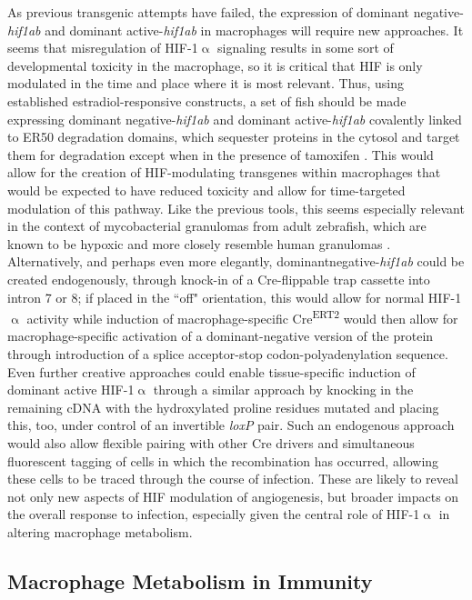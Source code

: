 As previous transgenic attempts have failed, the expression of dominant negative\hyp{}\textit{hif1ab} and dominant active\hyp{}\textit{hif1ab} in macrophages will require new approaches. It seems that misregulation of HIF\hyp{}1$\upalpha$ signaling results in some sort of developmental toxicity in the macrophage, so it is critical that HIF is only modulated in the time and place where it is most relevant. Thus, using established estradiol\hyp{}responsive constructs, a set of fish should be made expressing dominant negative\hyp{}\textit{hif1ab} and dominant active\hyp{}\textit{hif1ab} covalently linked to ER50 degradation domains, which sequester proteins in the cytosol and target them for degradation except when in the presence of tamoxifen \citep{Miyazaki2012}. This would allow for the creation of HIF\hyp{}modulating transgenes within macrophages that would be expected to have reduced toxicity and allow for time\hyp{}targeted modulation of this pathway. Like the previous tools, this seems especially relevant in the context of mycobacterial granulomas from adult zebrafish, which are known to be hypoxic and more closely resemble human granulomas \citep{Harper2012, Oehlers2015, Rustad2009}. Alternatively, and perhaps even more elegantly, dominantnegative\hyp{}\textit{hif1ab} could be created endogenously, through knock\hyp{}in of a Cre\hyp{}flippable trap cassette into intron 7 or 8; if placed in the ``off" orientation, this would allow for normal HIF\hyp{}1$\upalpha$ activity while induction of macrophage-specific Cre\textsuperscript{ERT2} would then allow for macrophage\hyp{}specific activation of a dominant\hyp{}negative version of the protein through introduction of a splice acceptor\hyp{}stop codon\hyp{}polyadenylation sequence. Even further creative approaches could enable tissue\hyp{}specific induction of dominant active HIF\hyp{}1$\upalpha$ through a similar approach by knocking in the remaining cDNA with the hydroxylated proline residues mutated and placing this, too, under control of an invertible \textit{loxP} pair. Such an endogenous approach would also allow flexible pairing with other Cre drivers and simultaneous fluorescent tagging of cells in which the recombination has occurred, allowing these cells to be traced through the course of infection. These are likely to reveal not only new aspects of HIF modulation of angiogenesis, but broader impacts on the overall response to infection, especially given the central role of HIF\hyp{}1$\upalpha$ in altering macrophage metabolism.

\subsection{Macrophage Metabolism in Immunity}\label{metabolism}

